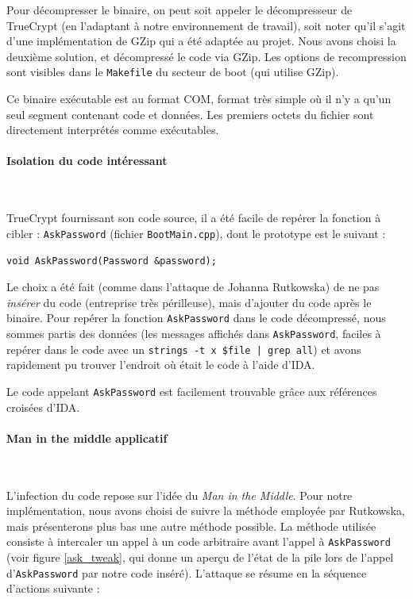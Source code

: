 \documentclass[12pt,a4paper]{article}
\begin{document}
Pour décompresser le binaire, on peut soit appeler le décompresseur de
TrueCrypt (en l'adaptant à notre environnement de travail), soit noter qu'il
s'agit d'une implémentation de GZip qui a été adaptée au projet. Nous avons
choisi la deuxième solution, et décompressé le code via GZip. Les options de
recompression sont visibles dans le \texttt{Makefile} du secteur de boot (qui utilise
GZip).

Ce binaire exécutable est au format COM, format très simple où il n'y a qu'un
seul segment contenant code et données. Les premiers octets du fichier sont
directement interprétés comme exécutables.

\paragraph{Isolation du code intéressant}~

TrueCrypt fournissant son code source, il a été facile de repérer la fonction à
cibler : \texttt{AskPassword} (fichier \texttt{BootMain.cpp}), dont le
prototype est le suivant :

\begin{center}
    \texttt{void AskPassword(Password \&password);}
\end{center}

Le choix a été fait (comme dans l'attaque de Johanna Rutkowska) de ne pas
\textit{insérer} du code (entreprise très périlleuse), mais d'ajouter du code
après le binaire. Pour repérer la fonction \texttt{AskPassword} dans le code
décompressé, nous sommes partis des données (les messages affichés dans
\texttt{AskPassword}, faciles à repérer dans le code avec un \texttt{strings -t x \$file
| grep all}) et avons rapidement pu trouver l'endroit où était le code à l'aide 
d'IDA.

Le code appelant \texttt{AskPassword} est facilement trouvable grâce aux
références croisées d'IDA.

\paragraph{Man in the middle applicatif}~

L'infection du code repose sur l'idée du \textit{Man in the Middle}. Pour notre
implémentation, nous avons choisi de suivre la méthode employée par Rutkowska,
mais présenterons plus bas une autre méthode possible. La méthode utilisée
consiste à intercaler un appel à un code arbitraire avant l'appel à 
\texttt{AskPassword} (voir figure \ref{ask_tweak}, qui donne un aperçu de l'état
de la pile lors de l'appel d'\texttt{AskPassword} par notre code inséré).
L'attaque se résume en la séquence d'actions suivante :
\end{document}
